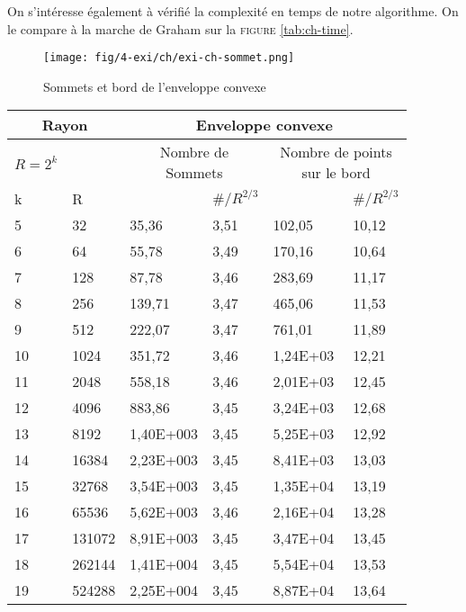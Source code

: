 On s'intéresse également à vérifié la complexité en temps de notre algorithme. On le compare à la marche de Graham sur la \textsc{figure} \ref{tab:ch-time}. 

\begin{figure}[H]
  \centering
  \texttt{[image: fig/4-exi/ch/exi-ch-sommet.png]}
  \caption{Sommets et bord de l'enveloppe convexe}
  \label{fig:ch} 
\end{figure}

\begin{table}[H]
  \begin{tabular}{|p{0.09\linewidth}|p{0.13\linewidth}||p{0.2\linewidth}|p{0.13\linewidth}||p{0.2\linewidth}|p{0.13\linewidth}|}
    \hline
    \multicolumn{2}{|c||}{Rayon} & \multicolumn{4}{c|}{Enveloppe convexe} \\  \hline 
    $R=2^k$  &  & \multicolumn{2}{c||}{Nombre de Sommets} &  \multicolumn{2}{c|}{Nombre de points sur le bord} \\ \hline 
    k & R &   & $\# / R^{2/3}$  &   & $\# / R^{2/3}$ \\    
    \hline
    5 & 32         & 35,36     & 3,51 & 102,05   &  10,12\\
    6 & 64         & 55,78     & 3,49 & 170,16   &  10,64\\
    7 & 128        & 87,78     & 3,46 & 283,69   &  11,17\\
    8 & 256        & 139,71    & 3,47 & 465,06   &  11,53\\
    9 & 512        & 222,07    & 3,47 & 761,01   &  11,89\\
    10 & 1024      & 351,72    & 3,46 & 1,24E+03 &  12,21\\
    11 & 2048      & 558,18    & 3,46 & 2,01E+03 &  12,45\\
    12 & 4096      & 883,86    & 3,45 & 3,24E+03 &  12,68\\
    13 & 8192      & 1,40E+003 & 3,45 & 5,25E+03 &  12,92\\
    14 & 16384     & 2,23E+003 & 3,45 & 8,41E+03 &  13,03\\
    15 & 32768     & 3,54E+003 & 3,45 & 1,35E+04 &  13,19\\
    16 & 65536     & 5,62E+003 & 3,46 & 2,16E+04 &  13,28\\
    17 & 131072    & 8,91E+003 & 3,45 & 3,47E+04 &  13,45\\
    18 & 262144    & 1,41E+004 & 3,45 & 5,54E+04 &  13,53\\
    19 & 524288    & 2,25E+004 & 3,45 & 8,87E+04 &  13,64\\

\end{tabular}
\end{table}
